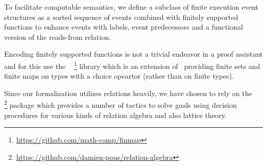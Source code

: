 To facilitate computable semantics, we define a subclass of
finite execution event structures as a sorted sequence of events
combined with finitely supported functions to enhance events with labels,
event predecessors and a functional version of the reads-from relation.

Encoding finitely supported functions is not a trivial endeavor in
a proof assistant and for this use the \finmap~%
\footnote{\url{https://github.com/math-comp/finmap}}
library which is an extension of \mathcomp~providing finite sets and
finite maps on types with a choice opeartor (rather than on finite types).

Since our formalization utilizes relations heavily, we have chosen
to rely on the \relationalgebra~%
\footnote{\url{https://github.com/damien-pous/relation-algebra}}
package which provides a number of tactics to solve goals using
decision procedures for various kinds of relation algebra and
also lattice theory.


